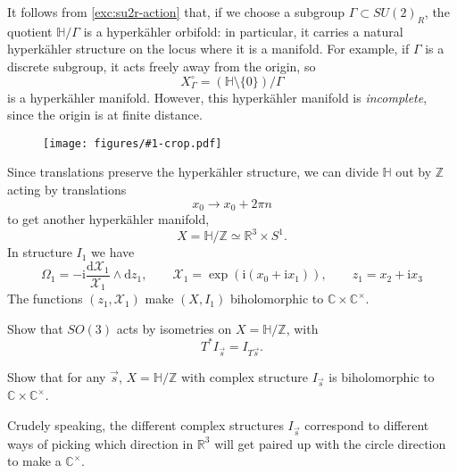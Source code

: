\documentclass[12pt,letterpaper,reqno]{amsart}
\numberwithin{equation}{section}
\newcommand{\cX}{\ensuremath{\mathcal X}}
\newcommand{\R}{\ensuremath{\mathbb R}}
\newcommand{\C}{\ensuremath{\mathbb C}}
\newcommand{\Z}{\ensuremath{\mathbb Z}}
\newcommand{\bbH}{\ensuremath{\mathbb H}}
\newcommand{\hk}{hyperk\"ahler\xspace}
\newcommand{\I}{{\mathrm i}}
\newcommand{\de}{\mathrm{d}}
\newcommand{\ti}[1]{\textit{#1}}
\newcommand{\insfig}[2]{\begin{figure}[htbp] \centering \texttt{[image: figures/\#1-crop.pdf]} \label{fig:#1} \end{figure}}
\begin{document}
\begin{example}[Quotients of $\bbH$] \label{exa:H-quotients}
It follows from \autoref{exc:su2r-action} that, if we choose a subgroup
$\Gamma \subset SU(2)_R$, the quotient
$\bbH / \Gamma$ is a \hk orbifold: in particular, it
carries a natural \hk structure 
on the locus where it is a manifold. For example,
if $\Gamma$ is a discrete subgroup, it acts
freely away from the origin, so
\begin{equation}
X_\Gamma^\circ = (\bbH \setminus \{0\}) / \Gamma  
\end{equation}
is a \hk manifold.
However, this \hk manifold is \ti{incomplete},
since the origin is at finite distance.
\end{example}

\insfig{higgs-bundles-4}{0.65}

\begin{example}[$\R^3 \times S^1$] \label{exa:R3S1}
Since translations preserve the \hk structure, we can divide $\bbH$
out by $\Z$ acting by translations 
\begin{equation}
 x_0 \to x_0 + 2 \pi n 
\end{equation}
to get another \hk manifold,
\begin{equation}
 X = \bbH / \Z \simeq \R^3 \times S^1.
\end{equation}
In structure $I_1$ we have
\begin{equation}
  \Omega_1 = -\I \frac{\de \cX_1}{\cX_1} \wedge \de z_1, \qquad \cX_1 = \exp(\I(x_0 + \I x_1)), \qquad z_1 = x_2 + \I x_3 
\end{equation}
The functions $(z_1,\cX_1)$ make $(X,I_1)$ 
biholomorphic to $\C \times \C^\times$.
\end{example}

\begin{exercise}
Show that $SO(3)$ acts by isometries on $X = \bbH / \Z$,
with
\begin{equation}
  T^* I_{\vec s} = I_{T \vec s}.
\end{equation}
\end{exercise}

\begin{exercise}
Show that for any $\vec s$, $X = \bbH / \Z$ with complex structure
$I_{\vec s}$ is biholomorphic to $\C \times \C^\times$.
\end{exercise}

Crudely speaking, the different complex structures 
$I_{\vec s}$ correspond to different ways of picking which 
direction in $\R^3$ will get 
paired up with the circle direction to make a $\C^\times$.
\end{document}
